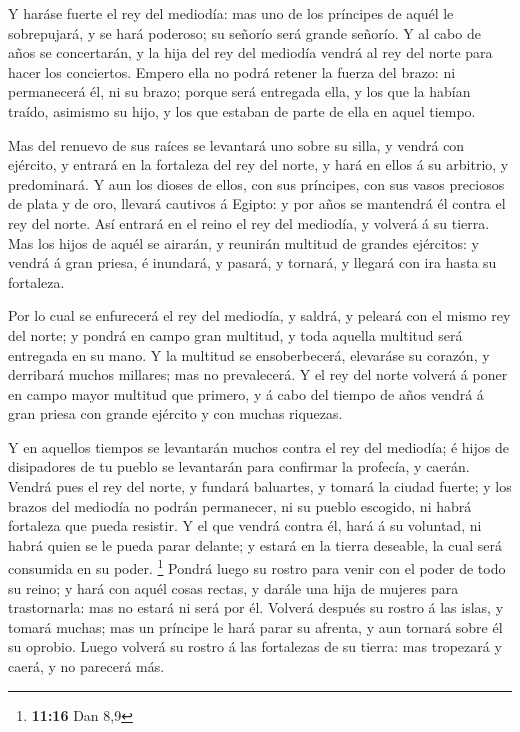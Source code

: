  Y haráse fuerte el rey del mediodía: mas uno de los
príncipes de aquél le sobrepujará, y se hará poderoso; su señorío será
grande señorío.  Y al cabo de años se concertarán, y la hija
del rey del mediodía vendrá al rey del norte para hacer los conciertos.
Empero ella no podrá retener la fuerza del brazo: ni permanecerá él, ni
su brazo; porque será entregada ella, y los que la habían traído,
asimismo su hijo, y los que estaban de parte de ella en aquel tiempo.

 Mas del renuevo de sus raíces se levantará uno sobre su
silla, y vendrá con ejército, y entrará en la fortaleza del rey del
norte, y hará en ellos á su arbitrio, y predominará.  Y aun
los dioses de ellos, con sus príncipes, con sus vasos preciosos de plata
y de oro, llevará cautivos á Egipto: y por años se mantendrá él contra
el rey del norte.  Así entrará en el reino el rey del
mediodía, y volverá á su tierra.  Mas los hijos de aquél se
airarán, y reunirán multitud de grandes ejércitos: y vendrá á gran
priesa, é inundará, y pasará, y tornará, y llegará con ira hasta su
fortaleza.

 Por lo cual se enfurecerá el rey del mediodía, y saldrá, y
peleará con el mismo rey del norte; y pondrá en campo gran multitud, y
toda aquella multitud será entregada en su mano.  Y la
multitud se ensoberbecerá, elevaráse su corazón, y derribará muchos
millares; mas no prevalecerá.  Y el rey del norte volverá á
poner en campo mayor multitud que primero, y á cabo del tiempo de años
vendrá á gran priesa con grande ejército y con muchas riquezas.

 Y en aquellos tiempos se levantarán muchos contra el rey
del mediodía; é hijos de disipadores de tu pueblo se levantarán para
confirmar la profecía, y caerán.  Vendrá pues el rey del
norte, y fundará baluartes, y tomará la ciudad fuerte; y los brazos del
mediodía no podrán permanecer, ni su pueblo escogido, ni habrá fortaleza
que pueda resistir.  Y el que vendrá contra él, hará á su
voluntad, ni habrá quien se le pueda parar delante; y estará en la
tierra deseable, la cual será consumida en su poder. \footnote{\textbf{11:16}
  Dan 8,9}  Pondrá luego su rostro para venir con el poder
de todo su reino; y hará con aquél cosas rectas, y darále una hija de
mujeres para trastornarla: mas no estará ni será por él. 
Volverá después su rostro á las islas, y tomará muchas; mas un príncipe
le hará parar su afrenta, y aun tornará sobre él su oprobio.
 Luego volverá su rostro á las fortalezas de su tierra: mas
tropezará y caerá, y no parecerá más.

